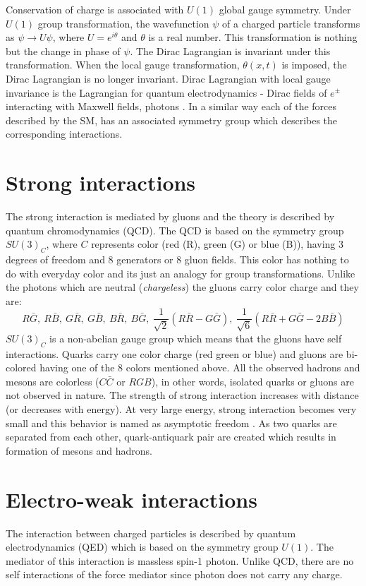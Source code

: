Conservation of charge is associated with $U(1)$ global gauge symmetry. Under $U(1)$ group transformation, the wavefunction $\psi$ of a 
charged particle transforms as $\psi \to U\psi$, where $U = e^{i\theta}$ and $\theta$ is a real number. This transformation is nothing but 
the change in phase of $\psi$. The Dirac Lagrangian is invariant under this transformation. When the local gauge transformation, 
$\theta(x,t)$ is imposed, the Dirac Lagrangian is no longer invariant. Dirac Lagrangian with local gauge invariance is the Lagrangian for 
quantum electrodynamics - Dirac fields of $e^\pm$ interacting with Maxwell fields, photons \cite{Griffiths:2008zz}.
In a similar way each of the forces described by the SM, has an associated symmetry group which describes the corresponding interactions.

\section{Strong interactions}
The strong interaction is mediated by gluons and the theory is described by quantum chromodynamics (QCD). The QCD is based on the symmetry 
group $SU(3)_C$, where $C$ represents color (red (R), green (G) or blue (B)), having 3 degrees of freedom and 8 generators or 8 gluon 
fields. 
This color has nothing to do with everyday color and its just an analogy for group transformations. Unlike the photons which are neutral
(\textit{chargeless}) the gluons carry color charge and they are:
\begin{equation*}
R\bar{G},\ R\bar{B},\ G\bar{R},\ G\bar{B},\ B\bar{R},\ B\bar{G},\ \frac{1}{\sqrt{2}}(R\bar{R}-G\bar{G}),\ \frac{1}{\sqrt{6}}(R\bar{R}+G\bar{G}-2B\bar{B}) 
\end{equation*}
$SU(3)_C$ is a non-abelian gauge group which means that the gluons have self interactions. Quarks carry one color charge (red green or 
blue) and gluons are bi-colored having one of the 8 colors mentioned above. All the observed hadrons and mesons are colorless ($C\bar{C}$ 
or $RGB$), in other words, isolated quarks or gluons are not observed in nature. The strength of strong interaction increases with distance (or decreases 
with energy). At very large energy, strong interaction becomes very small and this behavior is named as asymptotic freedom 
\cite{PhysRevLett.30.1343}\cite{PhysRevLett.30.1346}. As two quarks are separated from each other, quark-antiquark pair are created which results in formation of mesons and hadrons.

\section{Electro-weak interactions}\label{sec:EWint}
The interaction between charged particles is described by quantum electrodynamics (QED) which is based on the symmetry group $U(1)$. The 
mediator of this interaction is massless spin-1 photon. Unlike QCD, there are no self interactions of the force mediator since photon does 
not carry any charge.

